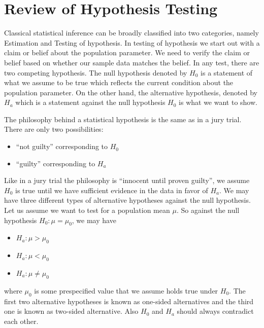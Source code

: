 \documentclass[12]{report}
\begin{document}

%


\section{Review of Hypothesis Testing}

Classical statistical inference can be broadly classified into two categories, namely Estimation and Testing of hypothesis. In testing of hypothesis we start out with a claim or belief about the population parameter. We need to verify the claim or belief based on whether our sample data matches the belief. In any test, there are two competing hypothesis. The null hypothesis denoted by $H_0$ is a statement of what we assume to be true which reflects the current condition about the population parameter. On the other hand, the alternative hypothesis, denoted by $H_a$ which is a statement against the null hypothesis $H_0$ is what we want to show. 

The philosophy behind a statistical hypothesis is the same as in a jury trial. There are only two possibilities:
\begin{itemize}
\item ``not guilty'' corresponding to $H_0$
\item ``guilty'' corresponding to $H_a$ 
\end{itemize}
Like in a jury trial the philosophy is ``innocent until proven guilty'', we assume $H_0$ is true until we have sufficient evidence in the data in favor of $H_a$. 
We may have three different types of alternative hypotheses against the null hypothesis. Let us assume we want to test for a population mean $\mu$. So against the null hypothesis $H_0: \mu = \mu_0$, we may have
\begin{itemize}
\item $H_a: \mu > \mu_0$
\item $H_a: \mu < \mu_0$ 
\item $H_a: \mu \ne \mu_0$
\end{itemize}
where $\mu_0$ is some prespecified value that we assume holds true under $H_0$. The first two alternative hypotheses is known as one-sided alternatives and the third one is known as two-sided alternative. Also $H_0$ and $H_a$ should always contradict each other.
\end{document}
